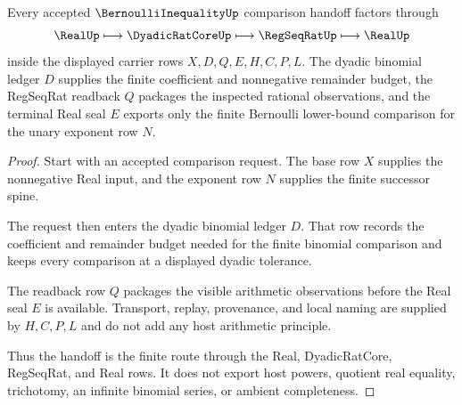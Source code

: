 \begin{theorem}\label{thm:bernoulli-inequality-dyadic-binomial-handoff}
Every accepted $\BernoulliInequalityUp$ comparison handoff factors through
$$
\RealUp \longmapsto \DyadicRatCoreUp \longmapsto \RegSeqRatUp \longmapsto \RealUp
$$
inside the displayed carrier rows $X,D,Q,E,H,C,P,L$. The dyadic binomial ledger $D$ supplies the finite coefficient and nonnegative remainder budget, the RegSeqRat readback $Q$ packages the inspected rational observations, and the terminal Real seal $E$ exports only the finite Bernoulli lower-bound comparison for the unary exponent row $N$.
\end{theorem}
\begin{proof}
Start with an accepted comparison request. The base row $X$ supplies the nonnegative Real input, and the exponent row $N$ supplies the finite successor spine.

The request then enters the dyadic binomial ledger $D$. That row records the coefficient and remainder budget needed for the finite binomial comparison and keeps every comparison at a displayed dyadic tolerance.

The readback row $Q$ packages the visible arithmetic observations before the Real seal $E$ is available. Transport, replay, provenance, and local naming are supplied by $H,C,P,L$ and do not add any host arithmetic principle.

Thus the handoff is the finite route through the Real, DyadicRatCore, RegSeqRat, and Real rows. It does not export host powers, quotient real equality, trichotomy, an infinite binomial series, or ambient completeness.
\end{proof}



